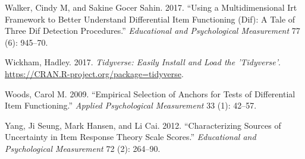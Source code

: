 \documentclass[
  11pt,
]{article}
\begin{document}
\leavevmode\hypertarget{ref-walker2017using}{}%
Walker, Cindy M, and Sakine Gocer Sahin. 2017. ``Using a Multidimensional Irt Framework to Better Understand Differential Item Functioning (Dif): A Tale of Three Dif Detection Procedures.'' \emph{Educational and Psychological Measurement} 77 (6): 945--70.

\leavevmode\hypertarget{ref-tidy}{}%
Wickham, Hadley. 2017. \emph{Tidyverse: Easily Install and Load the 'Tidyverse'}. \url{https://CRAN.R-project.org/package=tidyverse}.

\leavevmode\hypertarget{ref-woods2009empirical}{}%
Woods, Carol M. 2009. ``Empirical Selection of Anchors for Tests of Differential Item Functioning.'' \emph{Applied Psychological Measurement} 33 (1): 42--57.

\leavevmode\hypertarget{ref-yang2012characterizing}{}%
Yang, Ji Seung, Mark Hansen, and Li Cai. 2012. ``Characterizing Sources of Uncertainty in Item Response Theory Scale Scores.'' \emph{Educational and Psychological Measurement} 72 (2): 264--90.
\end{document}
